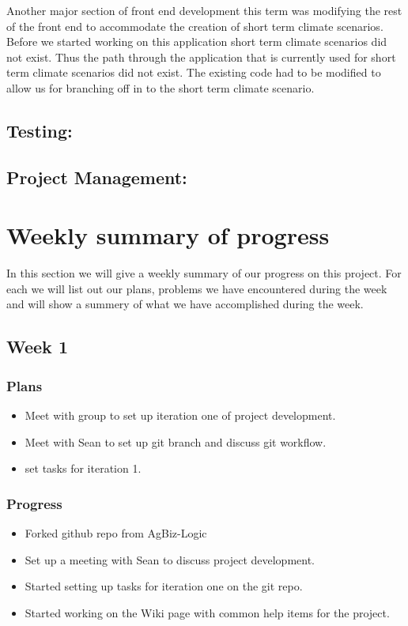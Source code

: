 \documentclass[onecolumn, draftclsnofoot,10pt, compsoc]{article}
\begin{document}
	Another major section of front end development this term was modifying the rest of the front end to accommodate the creation of short term climate scenarios. Before we started working on this application short term climate scenarios did not exist. Thus the path through the application that is currently used for short term climate scenarios did not exist. The existing code had to be modified to allow us for branching off in to the short term climate scenario.\\
	
	
		
		\subsection{Testing:}
		
		\subsection{Project Management:}
	
\section{Weekly summary of progress}
	   In this section we will give a weekly summary of our progress on this project. For each we will list out our plans, problems we have encountered during the week and will show a summery of what we have accomplished during the week.\\

		\subsection{Week 1}
			\subsubsection{Plans}
				\begin{itemize}
					\item Meet with group to set up iteration one of project development.
					\item Meet with Sean to set up git branch and discuss git workflow.
					\item set tasks for iteration 1.
				\end{itemize}

			\subsubsection{Progress}
				\begin{itemize}
					\item Forked github repo from AgBiz-Logic
					\item Set up a meeting with Sean to discuss project development.
					\item Started setting up tasks for iteration one on the git repo.
					\item Started working on the Wiki page with common help items for the project.
				\end{itemize}
\end{document}
